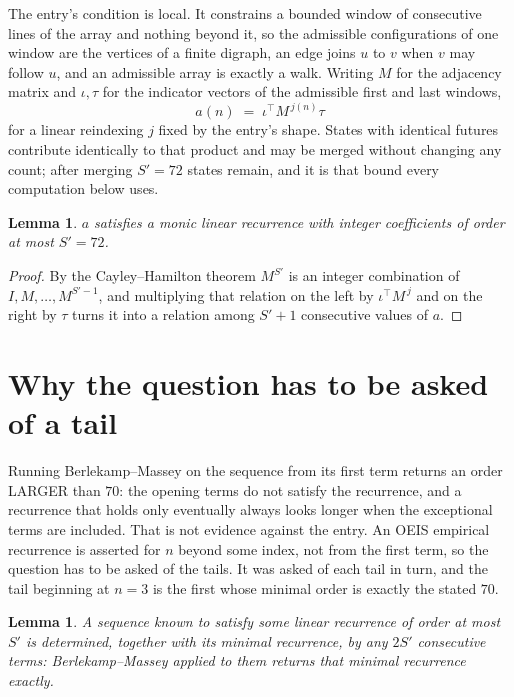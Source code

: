 \documentclass[11pt,a4paper]{article}
\theoremstyle{plain}
\newtheorem{lemma}[theorem]{Lemma}
\theoremstyle{definition}
\begin{document}
The entry's condition is local. It constrains a bounded window of consecutive lines of the
array and nothing beyond it, so the admissible configurations of one window are the vertices of
a finite digraph, an edge joins $u$ to $v$ when $v$ may follow $u$, and an admissible array is
exactly a walk. Writing $M$ for the adjacency matrix and $\iota,\tau$ for the indicator vectors
of the admissible first and last windows,
\[
a(n)\;=\;\iota^{\!\top}M^{\,j(n)}\tau
\]
for a linear reindexing $j$ fixed by the entry's shape. States with identical futures
contribute identically to that product and may be merged without changing any count; after
merging $S'=72$ states remain, and it is that bound every computation below uses.

\begin{lemma}\label{lem:cf}
$a$ satisfies a monic linear recurrence with integer coefficients of order at most $S'=72$.
\end{lemma}

\begin{proof}
By the Cayley--Hamilton theorem $M^{S'}$ is an integer combination of $I,M,\dots,M^{S'-1}$,
and multiplying that relation on the left by $\iota^{\!\top}M^{\,j}$ and on the right by
$\tau$ turns it into a relation among $S'+1$ consecutive values of $a$.
\end{proof}

\section{Why the question has to be asked of a tail}

Running Berlekamp--Massey on the sequence from its first term returns an order LARGER than $70$: the opening terms do not satisfy the recurrence, and a recurrence that holds only eventually always looks longer when the exceptional terms are included. That is not evidence against the entry. An OEIS empirical recurrence is asserted for $n$ beyond some index, not from the first term, so the question has to be asked of the tails. It was asked of each tail in turn, and the tail beginning at $n=3$ is the first whose minimal order is exactly the stated $70$.

\begin{lemma}\label{lem:bm}
A sequence known to satisfy some linear recurrence of order at most $S'$ is determined,
together with its minimal recurrence, by any $2S'$ consecutive terms: Berlekamp--Massey applied
to them returns that minimal recurrence exactly.
\end{lemma}
\end{document}

